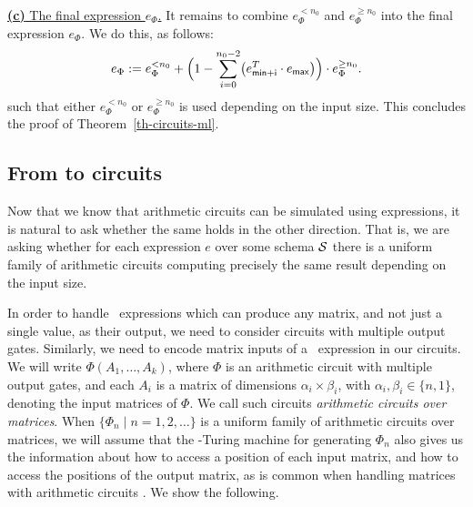 \medskip
\noindent
\underline{\textbf{(c)} The final expression $e_\Phi$.}
It remains to combine $e_\Phi^{< n_0}$ and $e_{\Phi}^{\geq n_0}$ into the final expression
$e_\Phi$. We do this, as follows:
$$
e_\Phi:=e_\Phi^{< n_0} + \Bigl(1 - \sum_{i=0}^{n_0-2} \bigl(e_{\mathsf{min}+\mathsf{i}}^T\cdot e_{\mathsf{max}}\bigr)\Bigr)\cdot e_{\Phi}^{\geq n_0}.
$$
such that either $e_{\Phi}^{<n_0}$ or $e_{\Phi}^{\geq n_0}$ is used depending on the input size. 
This concludes the proof of Theorem~\ref{th-circuits-ml}.



\subsection{From \langfor to circuits}\label{subsec:formatlangtoac}

Now that we know that arithmetic circuits can be simulated using \langfor expressions, it is natural to ask whether the same holds in the other direction. That is, we are asking whether for each \langfor expression $e$ over some schema $\mathcal{S}$ there is a uniform family of arithmetic circuits computing precisely the same result depending on the input size. 

In order to handle  \langfor\ expressions which can produce any matrix, and not just a single value, as their output, we need to consider circuits with multiple output gates. Similarly, we need to encode matrix inputs of a \langfor\ expression in our circuits. We will write $\Phi(A_1,\ldots ,A_k)$, where $\Phi$ is an arithmetic circuit with multiple output gates, and each $A_i$ is a matrix of dimensions $\alpha_i\times \beta_i$, with $\alpha_i,\beta_i \in \{n,1\}$, denoting the input matrices of $\Phi$. 
We call such circuits \textit{arithmetic circuits over matrices}. When $\{\Phi_n\mid n=1,2,\ldots\}$ is a uniform family of arithmetic circuits over matrices, we will assume that the \logspace-Turing machine for generating $\Phi_n$ also gives us the information about how to access a position of each input matrix, and how to access the positions of the output matrix, as is common when handling matrices with arithmetic circuits \cite{Raz02}. We show the following.

